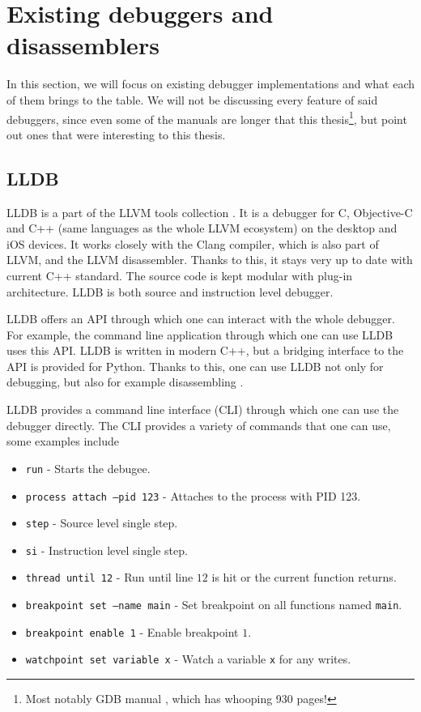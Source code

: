 \section{Existing debuggers and disassemblers}
In this section, we will focus on existing debugger implementations and what
each of them brings to the table. We will not be discussing every feature of
said debuggers, since even some of the manuals are longer that this
thesis\footnote{Most notably GDB manual \cite{gdb-manual}, which has whooping
930 pages!}, but point out ones that were interesting to this thesis.

\subsection{LLDB}
LLDB \cite{lldb} is a part of the LLVM tools collection \cite{llvm}. It is a
debugger for C, Objective-C and C++ (same languages as the whole LLVM
ecosystem) on the desktop and iOS devices. It works closely with the Clang
compiler, which is also part of LLVM, and the LLVM disassembler. Thanks to
this, it stays very up to date with current C++ standard. The source code is
kept modular with plug-in architecture. LLDB is both source and instruction
level debugger.

LLDB offers an API through which one can interact with the whole debugger. For
example, the command line application through which one can use LLDB uses this
API. LLDB is written in modern C++, but a bridging interface to the API is
provided for Python. Thanks to this, one can use LLDB not only for debugging,
but also for example disassembling \cite{lldb}.

LLDB provides a command line interface (CLI) through which one can use the debugger
directly. The CLI provides a variety of commands that one can use, some examples include
\begin{itemize}
    \item \texttt{run} - Starts the debugee.
    \item \texttt{process attach --pid 123} - Attaches to the process with PID
        123.
    \item \texttt{step} - Source level single step.
    \item \texttt{si} - Instruction level single step.
    \item \texttt{thread until 12} - Run until line $12$ is hit or the current
        function returns.
    \item \texttt{breakpoint set --name main} - Set breakpoint on all functions
        named \texttt{main}.
    \item \texttt{breakpoint enable 1} - Enable breakpoint $1$.
    \item \texttt{watchpoint set variable x} - Watch a variable \texttt{x} for
        any writes.
\end{itemize}

